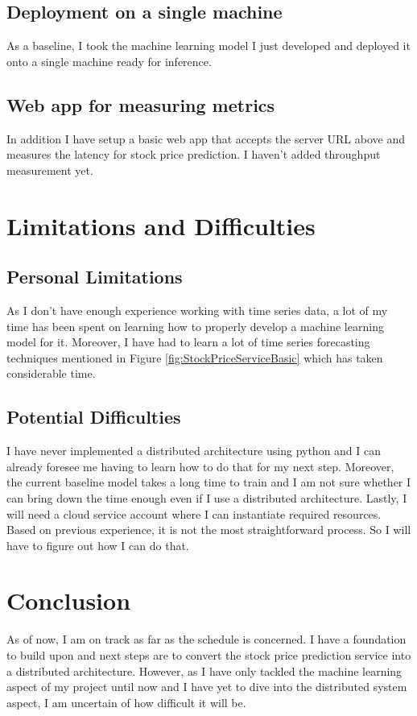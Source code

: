 \documentclass{report}
\def\backmatter{%
    \setcounter{section}{0}
    \renewcommand{\thesection}{\Alph{section}}
}%
\begin{document}
\section{Deployment on a single machine}

As a baseline, I took the machine learning model I just developed and deployed it onto a single machine ready for inference.

\section{Web app for measuring metrics}

In addition I have setup a basic web app that accepts the server URL above and measures the latency for stock price prediction. I haven't added throughput measurement yet.

\chapter{Limitations and Difficulties}\label{chap:limitations}
\section{Personal Limitations}
As I don't have enough experience working with time series data, a lot of my time has been spent on learning how to properly develop a machine learning model for it. Moreover, I have had to learn a lot of time series forecasting techniques mentioned in Figure \ref{fig:StockPriceServiceBasic} which has taken considerable time.

\section{Potential Difficulties}
I have never implemented a distributed architecture using python and I can already foresee me having to learn how to do that for my next step. Moreover, the current baseline model takes a long time to train and I am not sure whether I can bring down the time enough even if I use a distributed architecture. Lastly, I will need a cloud service account where I can instantiate required resources. Based on previous experience, it is not the most straightforward process. So I will have to figure out how I can do that.

\chapter{Conclusion}\label{chap:conclusion}
As of now, I am on track as far as the schedule is concerned. I have a foundation to build upon and next steps are to convert the stock price prediction service into a distributed architecture. However, as I have only tackled the machine learning aspect of my project until now and I have yet to dive into the distributed system aspect, I am uncertain of how difficult it will be. 

\backmatter

\printbibliography
\end{document}
